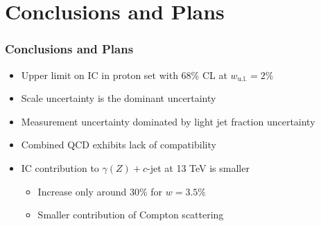\documentclass{beamer}
\newcommand{\backupbegin}{%
   \newcounter{finalframe}
   \setcounter{finalframe}{\value{framenumber}}
}
\newcommand{\backupend}{%
   \setcounter{framenumber}{\value{finalframe}}
}
\begin{document}
\section{Conclusions and Plans}

\begin{frame}
  \frametitle{Conclusions and Plans}

  \begin{itemize}
    \item Upper limit on IC in proton set with 68\% CL at
          $w_\mathrm{u.l.} = 2\%$
    \item Scale uncertainty is the dominant uncertainty
    \item Measurement uncertainty dominated by light jet fraction uncertainty
    \item Combined QCD exhibits lack of compatibility
    \item IC contribution to $\gamma(Z) + c$-jet at 13 TeV is smaller
          \begin{itemize}
            \item Increase only around 30\% for $w = 3.5\%$
            \item Smaller contribution of Compton scattering
          \end{itemize}
  \end{itemize}
\end{frame}

%
%
\end{document}
